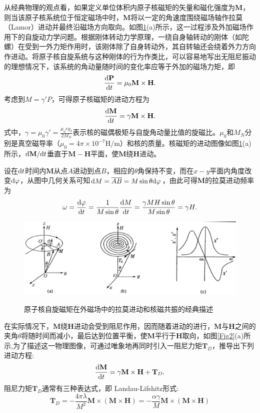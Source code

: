 \documentclass{buaaemp}
\begin{document}
从经典物理的观点看，如果定义单位体积内原子核磁矩的矢量和磁化强度为$\mathbf{M}$，则当该原子核系统位于恒定磁场中时，$\mathbf{M}$将以一定的角速度围绕磁场轴作拉莫（Lamor）进动并最终沿磁场方向取向。如图\ref{Fig1}(a)所示，这一过程涉及外加磁场作用下的自旋动力学问题。根据刚体转动力学原理，一绕自身轴转动的刚体（如陀螺）在受到一外力矩作用时，该刚体除了自身转动外，其自转轴还会绕着外力方向作进动。将原子核自旋系统与这种刚体的行为作类比，可以容易地写出无阻尼振动的理想情况下，该系统的角动量随时间的变化率应等于外加的磁场力矩，即
$$\frac{{\rm d}\mathbf{P}}{{\rm d}t}=\mu_0\mathbf{M}\times \mathbf{H}.$$
考虑到$M=\gamma'P$，可得原子核磁矩的进动方程为
$$\frac{{\rm d}\mathbf{M}}{{\rm d}t}=\gamma\mathbf{M}\times \mathbf{H}.$$
式中，$\gamma=\mu_0\gamma'=\frac{\mu_0eg_I}{2M_N}$表示核的磁偶极矩与自旋角动量比值的旋磁比。$\mu_0$和$M_N$分别是真空磁导率（$\mu_0=4\pi\times 10^{-7}\text{H/m}$）和核的质量。核磁矩的进动图像如图\ref{Fig1}(a)所示，${\rm d}\mathbf{M}/{\rm d}t$垂直于$\mathbf{M}-\mathbf{H}$平面，使$\mathbf{M}$绕$\mathbf{H}$进动。

设在${\rm d}t$时间内$\mathbf{M}$从点$A$进动到点$B$，相应的$\theta$角保持不变，而在$x-y$平面内角度改变${\rm d}\varphi$，从图中几何关系可知${\rm d}M=\overline{AB}=M\sin\theta{\rm d}\varphi$，由此可得$\mathbf{M}$的拉莫进动频率为
$$\omega=\frac{{\rm d}\varphi}{{\rm d}t}=\frac{1}{M\sin\theta}\frac{{\rm d}M}{{\rm d}t}=\frac{\gamma MH\sin\theta}{M\sin\theta}=\gamma H.$$

\begin{figure}[H]
\centering
\includegraphics[width = \linewidth]{image/1.png}\\
\caption{原子核自旋磁矩在外磁场中的拉莫进动和核磁共振的经典描述}
\label{Fig1}
\end{figure}

在实际情况下，$\mathbf{M}$绕$\mathbf{H}$进动会受到阻尼作用，因而随着进动的进行，$\mathbf{M}$与$\mathbf{H}$之间的夹角$\theta$将随时间而减小，最后达到位置平衡，使$\mathbf{M}$平行于$\mathbf{H}$取向，如图\ref{Fig2}(a)所示,为了描述这一物理图像，可通过唯象地再同时引入一阻尼力矩$\mathbf{T}_D$，推导出下列进动方程:
\begin{equation}\frac{{\rm d}\mathbf{M}}{{\rm d}t}=\gamma\mathbf{M}\times \mathbf{H}+\mathbf{T}_D.\label{9.1-1}\end{equation}
阻尼力矩$\mathbf{T}_D$通常有三种表达式，即
Landau-Lifshitz形式:
\begin{equation}
\mathbf{T}_D=-\frac{4\pi\lambda}{M^2}\mathbf{M}\times (\mathbf{M}\times \mathbf{H})=-\frac{\alpha\gamma}{M}\mathbf{M}\times (\mathbf{M}\times \mathbf{H})\label{9.1-2}
\end{equation}
\end{document}
